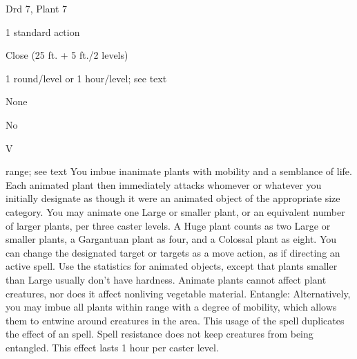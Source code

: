 
\begin{description*}
\item[Level:] Drd 7, Plant 7
\item[Casting Time:] 1 standard action
\item[Range:] Close (25 ft. + 5 ft./2 levels)
\item[Duration:] 1 round/level or 1 hour/level; see text
\item[Saving Throw:] None
\item[Spell Resistance:] No
\item[Components:] V
\end{description*}

range; see text
You imbue inanimate plants with mobility and a semblance of life. Each animated
plant then immediately attacks whomever or whatever you initially designate as
though it were an animated object of the appropriate size category. You may animate
one Large or smaller plant, or an equivalent number of larger plants, per three
caster levels. A Huge plant counts as two Large or smaller plants, a Gargantuan
plant as four, and a Colossal plant as eight. You can change the designated target
or targets as a move action, as if directing an active spell.
Use the statistics for animated objects, except that plants smaller than
Large usually don't have hardness.
Animate plants cannot affect plant creatures, nor does it affect nonliving
vegetable material.
Entangle: Alternatively, you may imbue all plants within range with a
degree of mobility, which allows them to entwine around creatures in the area.
This usage of the spell duplicates the effect of an  spell. Spell
resistance does not keep creatures from being entangled. This effect lasts 1 hour
per caster level.